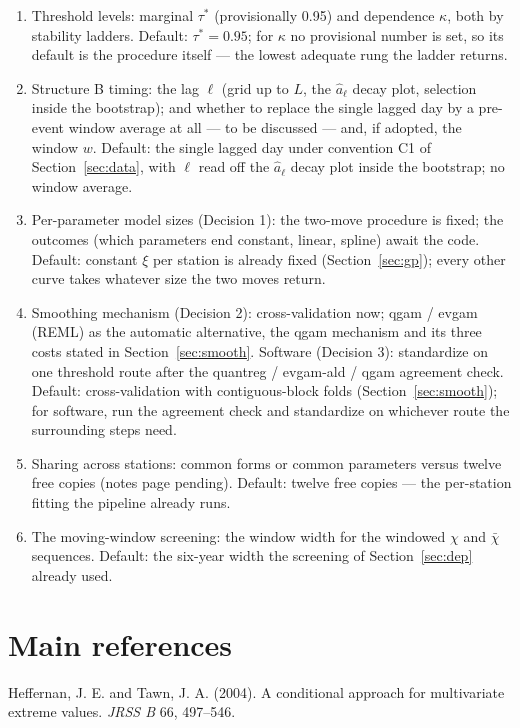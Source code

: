 \documentclass[11pt]{article}
\begin{document}
\begin{enumerate}
\item Threshold levels: marginal $\tau^{*}$ (provisionally 0.95) and dependence $\kappa$, both by stability ladders. Default: $\tau^{*} = 0.95$; for $\kappa$ no provisional number is set, so its default is the procedure itself --- the lowest adequate rung the ladder returns.
\item {\color{blue}Structure B timing: the lag $\ell$ (grid up to $L$, the $\hat a_\ell$ decay plot, selection inside the bootstrap); and whether to replace the single lagged day by a pre-event window average at all --- to be discussed --- and, if adopted, the window $w$.} Default: the single lagged day under convention C1 of Section~\ref{sec:data}, with $\ell$ read off the $\hat a_\ell$ decay plot inside the bootstrap; no window average.
\item Per-parameter model sizes (Decision 1): the two-move procedure is fixed; the outcomes (which parameters end constant, linear, spline) await the code. Default: constant $\xi$ per station is already fixed (Section~\ref{sec:gp}); every other curve takes whatever size the two moves return.
\item Smoothing mechanism (Decision 2): cross-validation now; qgam / evgam (REML) as the automatic alternative{\color{green}, the qgam mechanism and its three costs stated in Section~\ref{sec:smooth}}. Software (Decision 3): standardize on one threshold route after the quantreg / evgam-ald / qgam agreement check. Default: cross-validation with contiguous-block folds (Section~\ref{sec:smooth}); for software, run the agreement check and standardize on whichever route the surrounding steps need.
\item Sharing across stations: common forms or common parameters versus twelve free copies (notes page pending). Default: twelve free copies --- the per-station fitting the pipeline already runs.
\item The moving-window screening: the window width for the windowed $\chi$ and $\bar\chi$ sequences. Default: the six-year width the screening of Section~\ref{sec:dep} already used.
\end{enumerate}

\section*{Main references}

Heffernan, J. E. and Tawn, J. A. (2004). A conditional approach for multivariate extreme values. \textit{JRSS B} 66, 497--546.
\end{document}
